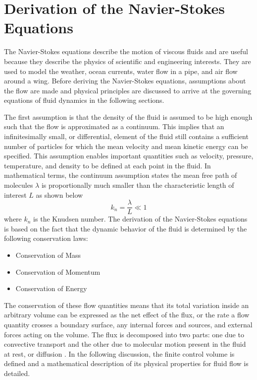 
\section{Derivation of the Navier-Stokes Equations}

The Navier-Stokes equations describe the motion of viscous fluids and are useful because they describe the physics of scientific and engineering interests. They are used to model the weather, ocean currents, water flow in a pipe, and air flow around a wing. Before deriving the Navier-Stokes equations, assumptions about the flow are made and physical principles are discussed to arrive at the governing equations of fluid dynamics in the following sections.

The first assumption is that the density of the fluid is assumed to be high enough such that the flow is approximated as a continuum. This implies that an infinitesimally small, or differential, element of the fluid still contains a sufficient number of particles for which the mean velocity and mean kinetic energy can be specified. This assumption enables important quantities such as velocity, pressure, temperature, and density to be defined at each point in the fluid. In mathematical terms, the continuum assumption states the mean free path of molecules $\lambda$ is proportionally much smaller than the characteristic length of interest $L$ as shown below
%
$$ k_n = \frac{\lambda}{L} \ll 1 $$
%
where $k_n$ is the Knudsen number. The derivation of the Navier-Stokes equations is based on the fact that the dynamic behavior of the fluid is determined by the following conservation laws:
%
\begin{itemize}
\item Conservation of Mass
\item Conservation of Momentum
\item Conservation of Energy
\end{itemize}

The conservation of these flow quantities means that its total variation inside an arbitrary volume can be expressed as the net effect of the flux, or the rate a flow quantity crosses a boundary surface, any internal forces and sources, and external forces acting on the volume. The flux is decomposed into two parts: one due to convective transport and the other due to molecular motion present in the fluid at rest, or diffusion \cite{BlazekText}. In the following discussion, the finite control volume is defined and a mathematical description of its physical properties for fluid flow is detailed.

